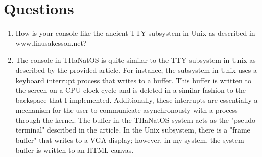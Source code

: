 \tableofcontents 
\newpage

\section{Questions}
    \begin{enumerate}
        \item How is your console like the ancient TTY subsystem in Unix as described in www.linusakesson.net?
        \item[] The console in THaNatOS is quite similar to the TTY subsystem in Unix as described by the provided article. For instance, the subsystem in Unix uses a keyboard interrupt process that writes to a buffer. This buffer is written to the screen on a CPU clock cycle and is deleted in a similar fashion to the backspace that I implemented. Additionally, these interrupts are essentially a mechanism for the user to communicate asynchronously with a process through the kernel. The buffer in the THaNatOS system acts as the "pseudo terminal" described in the article. In the Unix subsystem, there is a "frame buffer" that writes to a VGA display; however, in my system, the system buffer is written to an HTML canvas. 
    \end{enumerate}

%
%


